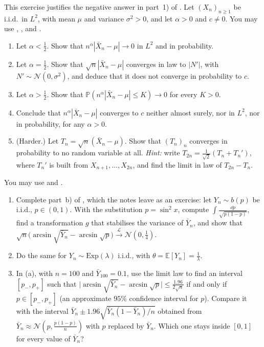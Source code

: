 \begin{exercise}\label{ex:ct-rate}
\medium This exercise justifies the negative answer in part~1) of . Let
$(X_n)_{n\ge1}$ be i.i.d.\ in $L^2$, with mean $\mu$ and variance $\sigma^2>0$, and let $\alpha>0$
and $c\ne0$. You may use , ,
 and .
\begin{enumerate}[label=(\alph*)]
  \item Let $\alpha<\frac12$. Show that $n^\alpha|\bar X_n-\mu|\to0$ in $L^2$ and in probability.
  \item Let $\alpha=\frac12$. Show that $\sqrt n|\bar X_n-\mu|$ converges in law to $|N'|$, with
    $N'\sim\mathcal N(0,\sigma^2)$, and deduce that it does not converge in probability to $c$.
  \item Let $\alpha>\frac12$. Show that $\mathbb P(n^\alpha|\bar X_n-\mu|\le K)\to0$ for every
    $K>0$.
  \item Conclude that $n^\alpha|\bar X_n-\mu|$ converges to $c$ neither almost surely, nor in $L^2$,
    nor in probability, for any $\alpha>0$.
  \item (Harder.) Let $T_n=\sqrt n(\bar X_n-\mu)$. Show that $(T_n)_n$ converges in probability to no
    random variable at all. \emph{Hint:} write $T_{2n}=\frac1{\sqrt2}(T_n+T_n')$, where $T_n'$ is
    built from $X_{n+1},\dots,X_{2n}$, and find the limit in law of $T_{2n}-T_n$.
\end{enumerate}
\end{exercise}

\begin{exercise}\label{ex:ct-stabilising}
\easy You may use  and .
\begin{enumerate}[label=(\alph*)]
  \item Complete part~b) of , which the notes leave as an exercise: let
    $Y_n\sim b(p)$ be i.i.d., $p\in(0,1)$. With the substitution $p=\sin^2x$, compute
    $\int\frac{\dd p}{\sqrt{p(1-p)}}$, find a transformation $g$ that stabilises the variance of
    $\bar Y_n$, and show that
    $\sqrt n\big(\arcsin\sqrt{\bar Y_n}-\arcsin\sqrt p\big)\xrightarrow{\mathcal L}\mathcal N(0,\frac14)$.
  \item Do the same for $Y_n\sim\mathrm{Exp}(\lambda)$ i.i.d., with $\theta=\mathbb E[Y_n]=\frac1\lambda$.
  \item In (a), with $n=100$ and $\bar Y_{100}=0.1$, use the limit law to find an interval
    $[p_-,p_+]$ such that $\big|\arcsin\sqrt{\bar Y_n}-\arcsin\sqrt p\big|\le\frac{1.96}{2\sqrt n}$
    if and only if $p\in[p_-,p_+]$ (an approximate $95\%$ confidence interval for $p$). Compare it
    with the interval $\bar Y_n\pm1.96\sqrt{\bar Y_n(1-\bar Y_n)/n}$ obtained from
    $\bar Y_n\approx\mathcal N(p,\frac{p(1-p)}n)$ with $p$ replaced by $\bar Y_n$. Which one stays
    inside $[0,1]$ for every value of $\bar Y_n$?
\end{enumerate}
\end{exercise}

